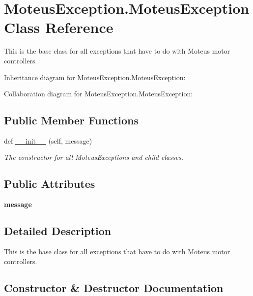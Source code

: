 \hypertarget{classMoteusException_1_1MoteusException}{}\section{Moteus\+Exception.\+Moteus\+Exception Class Reference}
\label{classMoteusException_1_1MoteusException}


This is the base class for all exceptions that have to do with Moteus motor controllers.  




Inheritance diagram for Moteus\+Exception.\+Moteus\+Exception\+:


Collaboration diagram for Moteus\+Exception.\+Moteus\+Exception\+:
\subsection*{Public Member Functions}
\begin{DoxyCompactItemize}
\item 
def \hyperlink{classMoteusException_1_1MoteusException_aaf3d5aa4275abc9e2f3b5c5d52812121}{\+\_\+\+\_\+init\+\_\+\+\_\+} (self, message)
\begin{DoxyCompactList}\small\item\em The constructor for all Moteus\+Exceptions and child classes. \end{DoxyCompactList}\end{DoxyCompactItemize}
\subsection*{Public Attributes}
\begin{DoxyCompactItemize}
\item 
\mbox{\label{classMoteusException_1_1MoteusException_a0dc2a33729217ee74aebbe138ed1d630}} 
{\bfseries message}
\end{DoxyCompactItemize}


\subsection{Detailed Description}
This is the base class for all exceptions that have to do with Moteus motor controllers. 

\subsection{Constructor \& Destructor Documentation}
\mbox{\label{classMoteusException_1_1MoteusException_aaf3d5aa4275abc9e2f3b5c5d52812121}} 
